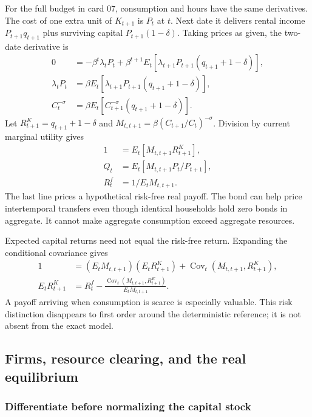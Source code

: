 For the full budget in card 07, consumption and hours have the same derivatives.
The cost of one extra unit of $K_{t+1}$ is $P_t$ at $t$. Next date it delivers
rental income $P_{t+1}q_{t+1}$ plus surviving capital $P_{t+1}(1-\delta)$.
Taking prices as given, the two-date derivative is
\begin{align}
0&=-\beta^t\lambda_tP_t
 +\beta^{t+1}E_t[\lambda_{t+1}P_{t+1}(q_{t+1}+1-\delta)],\\
\lambda_tP_t
 &=\beta E_t[\lambda_{t+1}P_{t+1}(q_{t+1}+1-\delta)],\\
C_t^{-\sigma}
 &=\beta E_t[C_{t+1}^{-\sigma}(q_{t+1}+1-\delta)].\label{eq:rbc-capital-euler}
\end{align}
Let $R^K_{t+1}=q_{t+1}+1-\delta$ and
$M_{t,t+1}=\beta(C_{t+1}/C_t)^{-\sigma}$. Division by current marginal utility gives
\begin{align}
1&=E_t[M_{t,t+1}R^K_{t+1}],\\
Q_t&=E_t[M_{t,t+1}P_t/P_{t+1}],\\
R_t^f&=1/E_tM_{t,t+1}.\label{eq:rbc-pricing}
\end{align}
The last line prices a hypothetical risk-free real payoff. The bond can help
price intertemporal transfers even though identical households hold zero bonds
in aggregate. It cannot make aggregate consumption exceed aggregate resources.

Expected capital returns need not equal the risk-free return. Expanding the
conditional covariance gives
\begin{align}
1&=(E_tM_{t,t+1})(E_tR^K_{t+1})
       +\operatorname{Cov}_t(M_{t,t+1},R^K_{t+1}),\\
E_tR^K_{t+1}
 &=R_t^f-\frac{\operatorname{Cov}_t(M_{t,t+1},R^K_{t+1})}{E_tM_{t,t+1}}.
\end{align}
A payoff arriving when consumption is scarce is especially valuable. This
risk distinction disappears to first order around the deterministic reference;
it is not absent from the exact model.

\subsection{Firms, resource clearing, and the real equilibrium}

\subsubsection{Differentiate before normalizing the capital stock}

